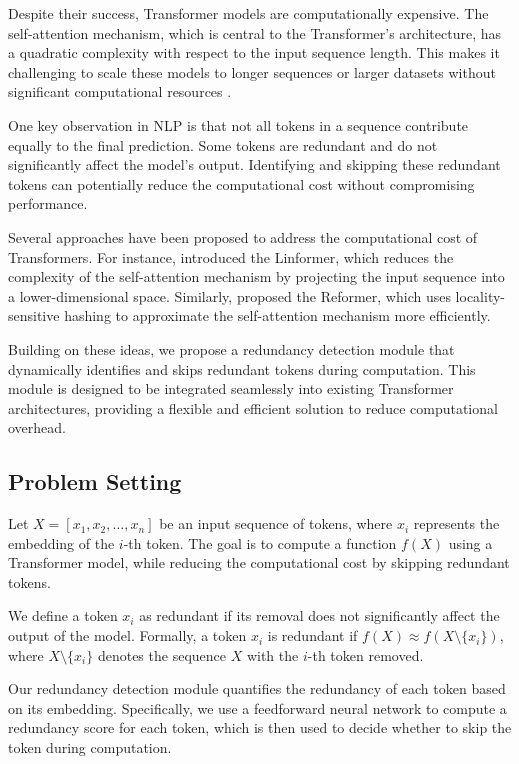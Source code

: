 \documentclass{article} %
\begin{document}
Despite their success, Transformer models are computationally expensive. The self-attention mechanism, which is central to the Transformer's architecture, has a quadratic complexity with respect to the input sequence length. This makes it challenging to scale these models to longer sequences or larger datasets without significant computational resources \citep{vaswani2017attention}.

One key observation in NLP is that not all tokens in a sequence contribute equally to the final prediction. Some tokens are redundant and do not significantly affect the model's output. Identifying and skipping these redundant tokens can potentially reduce the computational cost without compromising performance.

Several approaches have been proposed to address the computational cost of Transformers. For instance, \citet{Wang2020LinformerSW} introduced the Linformer, which reduces the complexity of the self-attention mechanism by projecting the input sequence into a lower-dimensional space. Similarly, \citet{Kitaev2020ReformerTE} proposed the Reformer, which uses locality-sensitive hashing to approximate the self-attention mechanism more efficiently.

Building on these ideas, we propose a redundancy detection module that dynamically identifies and skips redundant tokens during computation. This module is designed to be integrated seamlessly into existing Transformer architectures, providing a flexible and efficient solution to reduce computational overhead.

\subsection{Problem Setting}
\label{sec:problem_setting}

Let \( X = [x_1, x_2, \ldots, x_n] \) be an input sequence of tokens, where \( x_i \) represents the embedding of the \( i \)-th token. The goal is to compute a function \( f(X) \) using a Transformer model, while reducing the computational cost by skipping redundant tokens.

We define a token \( x_i \) as redundant if its removal does not significantly affect the output of the model. Formally, a token \( x_i \) is redundant if \( f(X) \approx f(X \setminus \{x_i\}) \), where \( X \setminus \{x_i\} \) denotes the sequence \( X \) with the \( i \)-th token removed.

Our redundancy detection module quantifies the redundancy of each token based on its embedding. Specifically, we use a feedforward neural network to compute a redundancy score for each token, which is then used to decide whether to skip the token during computation.
\end{document}
